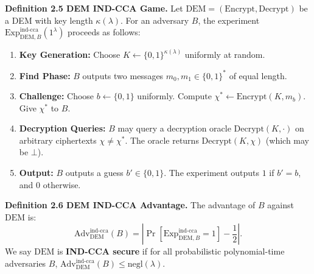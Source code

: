 \noindent\textbf{Definition 2.5 DEM IND-CCA Game.} Let $\text{DEM} = (\text{Encrypt}, \text{Decrypt})$ be a DEM with key length $\kappa(\lambda)$. For an adversary $B$, the experiment $\text{Exp}_{\text{DEM},B}^{\text{ind-cca}}(1^\lambda)$ proceeds as follows:
\begin{enumerate}
    \item \textbf{Key Generation:} Choose $K \gets \{0,1\}^{\kappa(\lambda)}$ uniformly at random.
    \item \textbf{Find Phase:} $B$ outputs two messages $m_0, m_1 \in \{0,1\}^*$ of equal length.
    \item \textbf{Challenge:} Choose $b \gets \{0,1\}$ uniformly. Compute $\chi^* \gets \text{Encrypt}(K, m_b)$. Give $\chi^*$ to $B$.
    \item \textbf{Decryption Queries:} $B$ may query a decryption oracle $\text{Decrypt}(K, \cdot)$ on arbitrary ciphertexts $\chi \neq \chi^*$. The oracle returns $\text{Decrypt}(K, \chi)$ (which may be $\bot$).
    \item \textbf{Output:} $B$ outputs a guess $b' \in \{0,1\}$. The experiment outputs $1$ if $b' = b$, and $0$ otherwise.
\end{enumerate}

\noindent\textbf{Definition 2.6 DEM IND-CCA Advantage.} The advantage of $B$ against $\text{DEM}$ is:
$$
\text{Adv}_{\text{DEM}}^{\text{ind-cca}}(B) = \left|\Pr[\text{Exp}_{\text{DEM},B}^{\text{ind-cca}} = 1] - \frac{1}{2}\right|.
$$
We say $\text{DEM}$ is \textbf{IND-CCA secure} if for all probabilistic polynomial-time adversaries $B$, $\text{Adv}_{\text{DEM}}^{\text{ind-cca}}(B) \le \text{negl}(\lambda)$.
